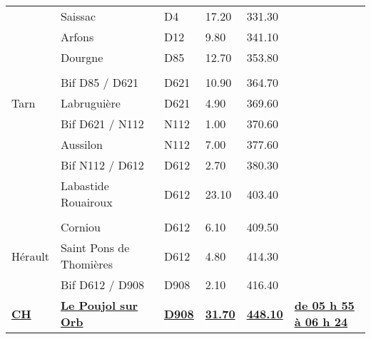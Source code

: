 \documentclass{article}%
\begin{document}
\begin{longtable}{p{2.25cm}|p{5.7cm}|p{3.0cm}|p{1.5cm}|p{1.5cm}|p{3.5cm}}
 &Saissac&D4 &17.20&331.30& \\%
 &Arfons&D12&9.80&341.10& \\%
 &Dourgne&D85&12.70&353.80& \\%
\hline& & & & & \\%
 &Bif D85 / D621&D621 &10.90&364.70& \\%
Tarn&Labruguière&D621 &4.90&369.60& \\%
 &Bif D621 / N112&N112&1.00&370.60& \\%
 &Aussilon &N112&7.00&377.60& \\%
 &Bif N112  / D612&D612 &2.70&380.30& \\%
 &Labastide Rouairoux&D612 &23.10&403.40& \\%
\hline& & & & & \\%
 &Corniou&D612 &6.10&409.50& \\%
Hérault&Saint Pons de Thomières&D612 &4.80&414.30& \\%
 &Bif D612 / D908&D908&2.10&416.40& \\%
\textbf{\underline{CH }}&\textbf{\underline{Le Poujol sur Orb}}&\textbf{\underline{D908}}&\textbf{\underline{31.70}}&\textbf{\underline{448.10}}&\textbf{\underline{de 05 h 55 à 06 h 24}}\\%
\hline%
\end{longtable}%
\end{document}
